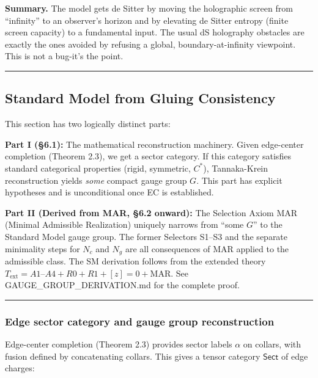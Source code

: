\documentclass[11pt,a4paper]{article}
\theoremstyle{remark}
\begin{document}
\textbf{Summary.} The model gets de Sitter by moving the holographic screen from
``infinity'' to an observer's horizon and by elevating de Sitter entropy
(finite screen capacity) to a fundamental input. The usual dS holography
obstacles are exactly the ones avoided by refusing a global,
boundary-at-infinity viewpoint. This is not a bug-it's the point.

\begin{center}\rule{0.5\linewidth}{0.5pt}\end{center}

\subsection{Standard Model from Gluing Consistency}\label{standard-model-from-gluing-consistency}

This section has two logically distinct parts:

\textbf{Part I (§6.1):} The mathematical reconstruction machinery. Given
edge-center completion (Theorem 2.3), we get a sector category. If this
category satisfies standard categorical properties (rigid, symmetric, \(C^*\)),
Tannaka-Krein reconstruction yields \emph{some} compact gauge group \(G\). This part
has explicit hypotheses and is unconditional once EC is established.

\textbf{Part II (Derived from MAR, §6.2 onward):} The Selection Axiom MAR
(Minimal Admissible Realization) uniquely narrows from ``some \(G\)'' to the
Standard Model gauge group. The former Selectors S1--S3 and the separate
minimality steps for \(N_c\) and \(N_g\) are all consequences of MAR applied to
the admissible class. The SM derivation follows from the extended theory
\(T_{\mathrm{ext}} = A1\text{--}A4 + R0 + R1 + [z]=0 + \mathrm{MAR}\).
See GAUGE\_GROUP\_DERIVATION.md for the complete proof.

\begin{center}\rule{0.5\linewidth}{0.5pt}\end{center}

\subsubsection{Edge sector category and gauge group reconstruction}\label{edge-sector-category-and-gauge-group-reconstruction}

Edge-center completion (Theorem 2.3) provides sector labels \(\alpha\) on collars,
with fusion defined by concatenating collars. This gives a tensor category
\(\mathsf{Sect}\) of edge charges:
\end{document}
